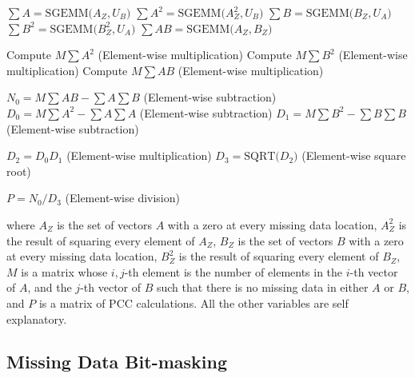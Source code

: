 \documentclass{bioinfo}
\begin{document}
\begin{algorithmic}[1]

  \STATE $\sum A=\text{SGEMM(}A_Z,U_B\text{)}$
  \STATE $\sum A^2=\text{SGEMM(}A_Z^2,U_B\text{)}$
  \STATE $\sum B=\text{SGEMM(}B_Z,U_A\text{)}$
  \STATE $\sum B^2=\text{SGEMM(}B_Z^2,U_A\text{)}$
  \STATE $\sum AB=\text{SGEMM(}A_Z,B_Z\text{)}$
  
  \vspace{2mm}

  \STATE Compute $M\sum A^2$   (Element-wise multiplication)
  \STATE Compute $M\sum B^2$   (Element-wise multiplication)
  \STATE Compute $M\sum AB$   (Element-wise multiplication)
  
  \vspace{2mm}

  \STATE $N_0=M\sum AB - \sum A\sum B$   (Element-wise subtraction)
  \STATE $D_0=M\sum A^2 - \sum A\sum A$   (Element-wise subtraction)
  \STATE $D_1=M\sum B^2 - \sum B\sum B$   (Element-wise subtraction)

  \vspace{2mm}

  \STATE $D_2=D_0 D_1 $   (Element-wise multiplication)
  \STATE $D_3=\text{SQRT(}D_2\text{)}$   (Element-wise square root)

  \vspace{2mm}

  \STATE $P=N_0 / D_3$   (Element-wise division)
  
\end{algorithmic}

\vspace{2mm}

\noindent where  $A_Z$ is the set of vectors $A$ with a zero at every 
missing data location, $A_Z^2$ is the result of squaring every element 
of $A_Z$, $B_Z$ is the set of vectors $B$ with a zero at every 
missing data location, $B_Z^2$ is the result of squaring every element 
of $B_Z$, $M$ is a matrix whose $i, j$-th element is the number of 
elements in the $i$-th vector of $A$, and the $j$-th vector of $B$ 
such that there is no missing data in either $A$ or $B$, and $P$ is 
a matrix of PCC calculations. All the other variables are self explanatory. \vspace*{-6pt}

\subsection{Missing Data Bit-masking} \label{MDBM}
\end{document}
